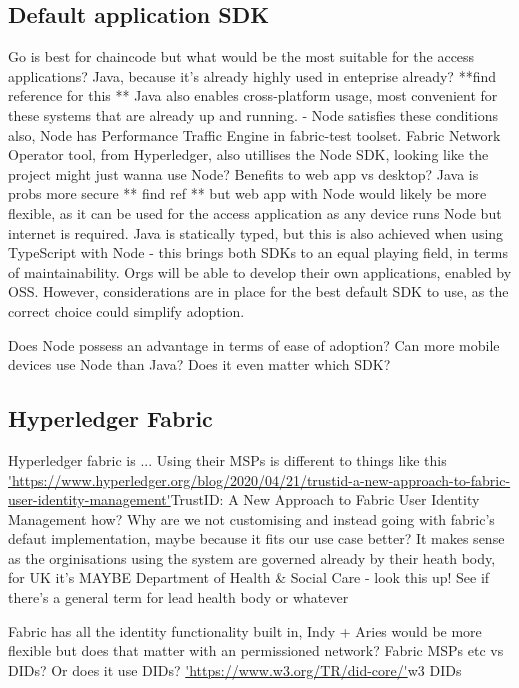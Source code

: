 \subsection{Default application SDK}
Go is best for chaincode but what would be the most suitable for the access applications? Java, because it's already highly used in enteprise already? **find reference for this ** 
Java also enables cross-platform usage, most convenient for these systems that are already up and running. - Node satisfies these conditions also, Node has Performance Traffic Engine in fabric-test toolset.
Fabric Network Operator tool, from Hyperledger, also utillises the Node SDK, looking like the project might just wanna use Node? Benefits to web app vs desktop? 
Java is probs more secure ** find ref ** but web app with Node would likely be more flexible, as it can be used for the access application as any device runs Node but internet is required.
Java is statically typed, but this is also achieved when using TypeScript with Node - this brings both SDKs to an equal playing field, in terms of maintainability.
Orgs will be able to develop their own applications, enabled by OSS. However, considerations are in place for the best default SDK to use, as the correct choice could simplify adoption.

Does Node possess an advantage in terms of ease of adoption? Can more mobile devices use Node than Java? Does it even matter which SDK? 


\subsection{Hyperledger Fabric}
Hyperledger fabric is ... Using their MSPs is different to things like this \url{'https://www.hyperledger.org/blog/2020/04/21/trustid-a-new-approach-to-fabric-user-identity-management'}{TrustID: A New Approach to Fabric User Identity Management} how? Why are we not customising and instead going with fabric's defaut implementation, maybe because it fits our use case better? It makes sense as the orginisations using the system are governed already by their heath body, for UK it's MAYBE Department of Health \& Social Care - look this up! See if there's a general term for lead health body or whatever

Fabric has all the identity functionality built in, Indy + Aries would be more flexible but does that matter with an permissioned network? Fabric MSPs etc vs DIDs? Or does it use DIDs? \url{'https://www.w3.org/TR/did-core/'}{w3 DIDs}


